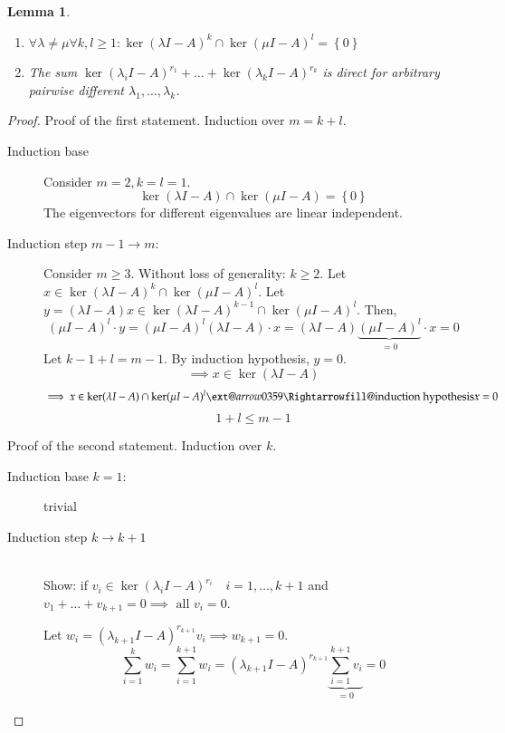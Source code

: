 \documentclass{article}
\makeatletter
\newtheorem{lemma}{Lemma}  \numberwithin{lemma}{section}
\newcommand{\set}[1]{\left\{#1\right\}}
\newcommand{\xRightarrow}[2][]{\ext@arrow 0359\Rightarrowfill@{#1}{#2}}
\makeatother
\begin{document}
\begin{lemma} %
  \label{le1113}
  \begin{enumerate}
    \item $\forall \lambda \neq \mu \forall k,l \geq 1: \ker(\lambda I - A)^k \cap \ker(\mu I - A)^l = \set{0}$
    \item The sum $\ker(\lambda_i I - A)^{r_1} + \dots + \ker(\lambda_k I - A)^{r_k}$ is direct for arbitrary pairwise different $\lambda_1, \dots, \lambda_k$.
  \end{enumerate}
\end{lemma}

\begin{proof}
  Proof of the first statement. Induction over $m = k + l$.
  \begin{description}
    \item[Induction base] 
      Consider $m = 2, k = l = 1$.
      \[ \ker(\lambda I - A) \cap \ker(\mu I - A) = \set{0} \]
      The eigenvectors for different eigenvalues are linear independent.
    \item[Induction step $m-1 \to m$:]
      Consider $m \geq 3$. Without loss of generality: $k \geq 2$.
      Let $x \in \ker(\lambda I - A)^k \cap \ker(\mu I - A)^l$.
      Let $y = (\lambda I - A)x \in \ker(\lambda I - A)^{k-1} \cap \ker(\mu I - A)^l$. Then,
      \[ (\mu I - A)^l \cdot y = (\mu I - A)^l (\lambda I - A) \cdot x = (\lambda I - A) \underbrace{(\mu I - A)^l}_{=0} \cdot x = 0 \]
      Let $k - 1 + l = m - 1$.
      By induction hypothesis, $y = 0$.
      \[ \implies x \in \ker(\lambda I - A) \]
      \[ \implies x \in \ker(\lambda I - A) \cap \ker(\mu I - A)^l \xRightarrow{\text{induction hypothesis}} x = 0 \]
      \[ 1 + l \leq m - 1 \]
  \end{description}

  Proof of the second statement. Induction over $k$.
  \begin{description}
    \item[Induction base $k = 1$:] trivial
    \item[Induction step $k \to k+1$] \hfill{} \\
      Show: if $v_i \in \ker(\lambda_i I - A)^{r_i} \quad i = 1, \dots, k+1$ and $v_1 + \dots + v_{k+1} = 0
      \implies \text{ all } v_i = 0$.

      Let $w_i = (\lambda_{k+1} I - A)^{r_{k+1}} v_i \implies w_{k+1} = 0$.
      \[ \sum_{i=1}^k w_i = \sum_{i=1}^{k+1} w_i = (\lambda_{k+1} I - A)^{r_{k+1}} \underbrace{\sum_{i=1}^{k+1} v_i}_{=0} = 0 \]


\end{description}
\end{proof}
\end{document}
